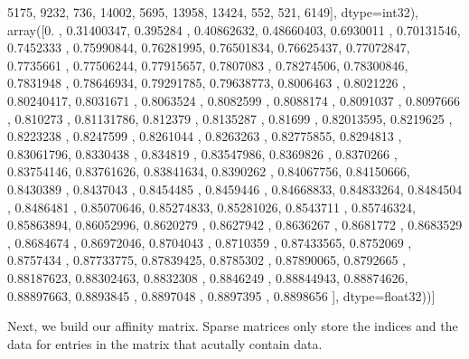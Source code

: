 \documentclass[letterpaper,10pt,english]{jupyterBook}
\begin{document}
\begin{sphinxVerbatim}[commandchars=\\\{\}]
          5175,  9232,   736, 14002,  5695, 13958, 13424,   552,   521,
          6149], dtype=int32),
  array([0.        , 0.31400347, 0.395284  , 0.40862632, 0.48660403,
         0.6930011 , 0.70131546, 0.7452333 , 0.75990844, 0.76281995,
         0.76501834, 0.76625437, 0.77072847, 0.7735661 , 0.77506244,
         0.77915657, 0.7807083 , 0.78274506, 0.78300846, 0.7831948 ,
         0.78646934, 0.79291785, 0.79638773, 0.8006463 , 0.8021226 ,
         0.80240417, 0.8031671 , 0.8063524 , 0.8082599 , 0.8088174 ,
         0.8091037 , 0.8097666 , 0.810273  , 0.81131786, 0.812379  ,
         0.8135287 , 0.81699   , 0.82013595, 0.8219625 , 0.8223238 ,
         0.8247599 , 0.8261044 , 0.8263263 , 0.82775855, 0.8294813 ,
         0.83061796, 0.8330438 , 0.834819  , 0.83547986, 0.8369826 ,
         0.8370266 , 0.83754146, 0.83761626, 0.83841634, 0.8390262 ,
         0.84067756, 0.84150666, 0.8430389 , 0.8437043 , 0.8454485 ,
         0.8459446 , 0.84668833, 0.84833264, 0.8484504 , 0.8486481 ,
         0.85070646, 0.85274833, 0.85281026, 0.8543711 , 0.85746324,
         0.85863894, 0.86052996, 0.8620279 , 0.8627942 , 0.8636267 ,
         0.8681772 , 0.8683529 , 0.8684674 , 0.86972046, 0.8704043 ,
         0.8710359 , 0.87433565, 0.8752069 , 0.8757434 , 0.87733775,
         0.87839425, 0.8785302 , 0.87890065, 0.8792665 , 0.88187623,
         0.88302463, 0.8832308 , 0.8846249 , 0.88844943, 0.88874626,
         0.88897663, 0.8893845 , 0.8897048 , 0.8897395 , 0.8898656 ],
        dtype=float32))]
\end{sphinxVerbatim}

\sphinxAtStartPar
Next, we build our affinity matrix. Sparse matrices only store the indices and the data for entries in the matrix that acutally contain data.
\end{document}
